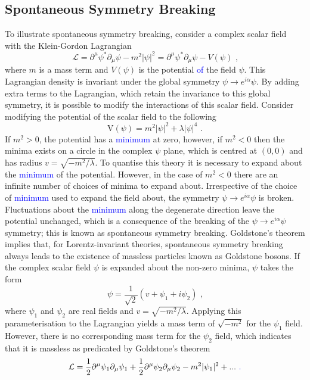 \subsection{Spontaneous Symmetry Breaking}
\label{sec:ssb}
To illustrate spontaneous symmetry breaking, consider a complex scalar field \psi with the Klein-Gordon Lagrangian
%
\begin{equation}
\mathcal{L} = \partial^{\mu} \psi^{*} \partial_{\mu} \psi -m^{2} |\psi|^{2} = \partial^{\mu} \psi^{*} \partial_{\mu} \psi - V(\psi) \text{ ,}
\label{equ:kleingordon}
\end{equation}
%
\noindent where $m$ is a mass term and $V(\psi)$ is the potential \textcolor{blue}{of} the field $\psi$.  This Lagrangian density is invariant under the global symmetry $\psi \rightarrow e^{i\alpha} \psi$.  By adding extra terms to the Lagrangian, which retain the invariance to this global symmetry, it is possible to modify the interactions of this scalar field.  Consider modifying the potential of the scalar field to the following
%
\begin{equation}
\text{V}(\psi) = m^{2}|\psi|^{2} + \lambda |\psi|^{4} \text{ .}
\end{equation}
%
\noindent If $m^{2} > 0$, the potential has a \textcolor{blue}{minimum} at zero, however, if $m^{2} < 0$ then the minima exists on a circle in the complex $\psi$ plane, which is centred at $(0,0)$ and has radius $v = \sqrt{-m^{2}/\lambda}$.  To quantise this theory it is necessary to expand about the \textcolor{blue}{minimum} of the potential.  However, in the case of $m^{2} < 0$ there are an infinite number of choices of minima to expand about.  Irrespective of the choice of \textcolor{blue}{minimum} used to expand the field about, the symmetry $\psi \rightarrow e^{i\alpha} \psi$ is broken.  Fluctuations about the \textcolor{blue}{minimum} along the degenerate direction leave the potential unchanged, which is a consequence of the breaking of the $\psi \rightarrow e^{i\alpha} \psi$ symmetry; this is known as spontaneous symmetry breaking.  Goldstone's theorem \cite{Goldstone:1962es} implies that, for Lorentz-invariant theories, spontaneous symmetry breaking always leads to the existence of massless particles known as Goldstone bosons.  If the complex scalar field $\psi$ is expanded about the non-zero minima, $\psi$ takes the form
%
\begin{equation}
\psi = \frac{1}{\sqrt{2}}(v + \psi_{1} + i \psi_{2}) \text{ ,}
\label{equ:minima}
\end{equation}
%
\noindent where $\psi_{1}$ and $\psi_{2}$ are real fields and $v = \sqrt{-m^{2}/\lambda}$.  Applying this parameterisation to the Lagrangian yields a mass term of $\sqrt{-m^{2}}$ for the $\psi_{1}$ field.  However, there is no corresponding mass term for the $\psi_{2}$ field, which indicates that it is massless as predicated by Goldstone's theorem
%
\begin{equation}
\mathcal{L} = \frac{1}{2}\partial^{\mu} \psi_{1} \partial_{\mu} \psi_{1} + \frac{1}{2}\partial^{\mu} \psi_{2} \partial_{\mu} \psi_{2} - m^{2}|\psi_{1}|^{2} + ... \text{ \textcolor{blue}{.}}
\end{equation}

